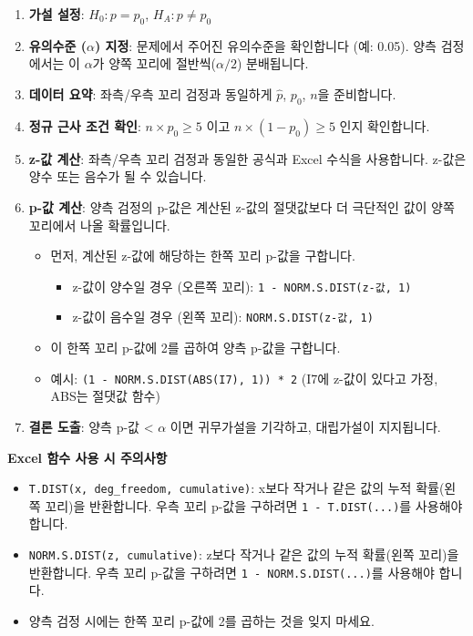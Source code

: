 \documentclass[11pt,a4paper]{article}
\theoremstyle{definition}
\begin{document}
\begin{enumerate}
    \item \textbf{가설 설정}: $H_0: p = p_0$, $H_A: p \ne p_0$
    \item \textbf{유의수준 ($\alpha$) 지정}: 문제에서 주어진 유의수준을 확인합니다 (예: 0.05). 양측 검정에서는 이 $\alpha$가 양쪽 꼬리에 절반씩($\alpha/2$) 분배됩니다.
    \item \textbf{데이터 요약}: 좌측/우측 꼬리 검정과 동일하게 $\hat{p}$, $p_0$, $n$을 준비합니다.
    \item \textbf{정규 근사 조건 확인}: $n \times p_0 \ge 5$ 이고 $n \times (1 - p_0) \ge 5$ 인지 확인합니다.
    \item \textbf{z-값 계산}: 좌측/우측 꼬리 검정과 동일한 공식과 Excel 수식을 사용합니다. z-값은 양수 또는 음수가 될 수 있습니다.
    \item \textbf{p-값 계산}: 양측 검정의 p-값은 계산된 z-값의 절댓값보다 더 극단적인 값이 양쪽 꼬리에서 나올 확률입니다.
    \begin{itemize}
        \item 먼저, 계산된 z-값에 해당하는 한쪽 꼬리 p-값을 구합니다.
        \begin{itemize}
            \item z-값이 양수일 경우 (오른쪽 꼬리): \texttt{1 - NORM.S.DIST(z-값, 1)}
            \item z-값이 음수일 경우 (왼쪽 꼬리): \texttt{NORM.S.DIST(z-값, 1)}
        \end{itemize}
        \item 이 한쪽 꼬리 p-값에 2를 곱하여 양측 p-값을 구합니다.
        \item 예시: \texttt{(1 - NORM.S.DIST(ABS(I7), 1)) * 2} (I7에 z-값이 있다고 가정, ABS는 절댓값 함수)
    \end{itemize}
    \item \textbf{결론 도출}: 양측 p-값 < $\alpha$ 이면 귀무가설을 기각하고, 대립가설이 지지됩니다.
\end{enumerate}

\begin{warningbox}
\textbf{Excel 함수 사용 시 주의사항}
\begin{itemize}
    \item \texttt{T.DIST(x, deg\_freedom, cumulative)}: x보다 작거나 같은 값의 누적 확률(왼쪽 꼬리)을 반환합니다. 우측 꼬리 p-값을 구하려면 \texttt{1 - T.DIST(...)}를 사용해야 합니다.
    \item \texttt{NORM.S.DIST(z, cumulative)}: z보다 작거나 같은 값의 누적 확률(왼쪽 꼬리)을 반환합니다. 우측 꼬리 p-값을 구하려면 \texttt{1 - NORM.S.DIST(...)}를 사용해야 합니다.
    \item 양측 검정 시에는 한쪽 꼬리 p-값에 2를 곱하는 것을 잊지 마세요.
\end{itemize}
\end{warningbox}
\end{document}
